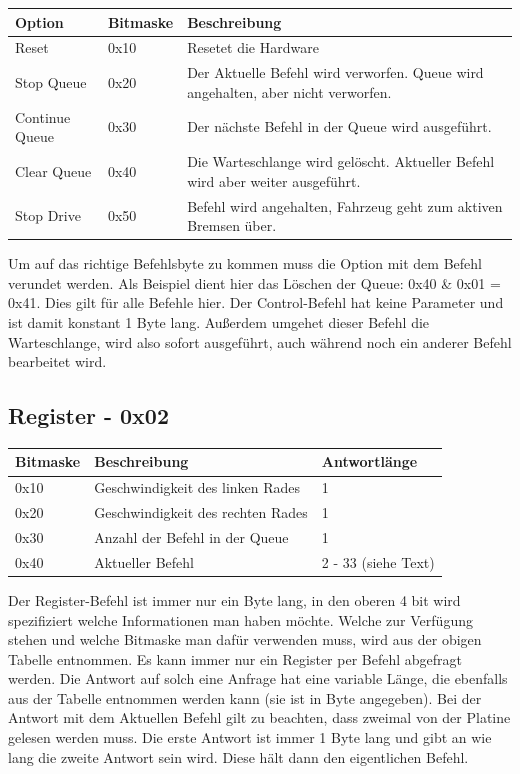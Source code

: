\documentclass[a4paper]{article}
\begin{document}
	\begin{tabularx}{\linewidth}{|l|l|X|}
		\hline
		\textbf{Option} & \textbf{Bitmaske} & \textbf{Beschreibung} \\
		\hline
		\hline
		Reset 			& 0x10 				& Resetet die Hardware \\
		\hline
		Stop Queue		& 0x20				& Der Aktuelle Befehl wird verworfen. Queue wird angehalten, aber nicht verworfen. \\
		\hline
		Continue Queue	& 0x30				& Der nächste Befehl in der Queue wird ausgeführt. \\
		\hline
		Clear Queue		& 0x40				& Die Warteschlange wird gelöscht. Aktueller Befehl wird aber weiter ausgeführt. \\
		\hline
		Stop Drive		& 0x50				& Befehl wird angehalten, Fahrzeug geht zum aktiven Bremsen über. \\
		\hline
	\end{tabularx}

	Um auf das richtige Befehlsbyte zu kommen muss die Option mit dem Befehl verundet werden. Als Beispiel dient hier das Löschen
	der Queue: 0x40 \& 0x01 = 0x41. Dies gilt für alle Befehle hier.
	Der Control-Befehl hat keine Parameter und ist damit konstant 1 Byte lang. Außerdem umgehet dieser Befehl die Warteschlange,
	wird also sofort ausgeführt, auch während noch ein anderer Befehl bearbeitet wird.

	\subsection{Register - 0x02}

	\begin{tabularx}{\linewidth}{|l|l|X|}
		\hline
		\textbf{Bitmaske} & \textbf{Beschreibung} & \textbf{Antwortlänge} \\
		\hline
		\hline
		0x10 				& Geschwindigkeit des linken Rades & 1 \\
		\hline
		0x20				& Geschwindigkeit des rechten Rades & 1 \\
		\hline
		0x30				& Anzahl der Befehl in der Queue & 1 \\
		\hline
		0x40				& Aktueller Befehl & 2 - 33 (siehe Text) \\
		\hline
	\end{tabularx}
	
	Der Register-Befehl ist immer nur ein Byte lang, in den oberen 4 bit wird spezifiziert welche Informationen man haben möchte.
	Welche zur Verfügung stehen und welche Bitmaske man dafür verwenden muss, wird aus der obigen Tabelle entnommen. Es kann immer
	nur ein Register per Befehl abgefragt werden. Die Antwort auf solch eine Anfrage hat eine variable Länge, die ebenfalls aus
	der Tabelle entnommen werden kann (sie ist in Byte angegeben).
	Bei der Antwort mit dem Aktuellen Befehl gilt zu beachten, dass zweimal von der Platine gelesen werden muss. Die erste
	Antwort ist immer 1 Byte lang und gibt an wie lang die zweite Antwort sein wird. Diese hält dann den eigentlichen Befehl.
\end{document}
